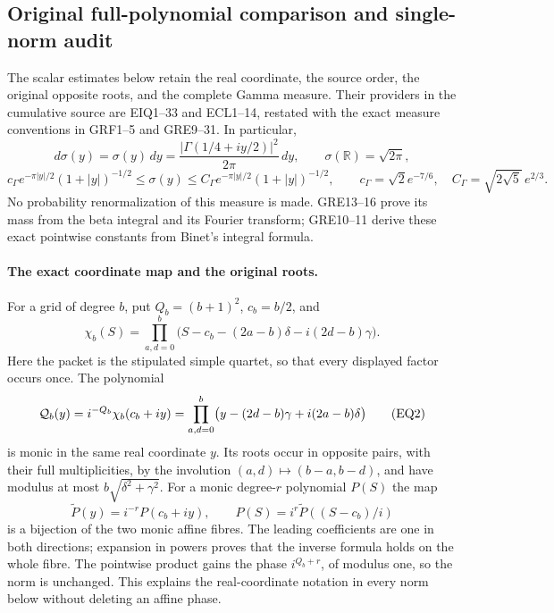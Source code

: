 \documentclass[11pt,a4paper]{article}
\begin{document}

\subsection{Original full-polynomial comparison and single-norm audit}
\label{eqreview:section}

The scalar estimates below retain the real coordinate, the source order,
the original opposite roots, and the complete Gamma measure.  Their
providers in the cumulative source are EIQ1--33 and ECL1--14, restated
with the exact measure conventions in GRF1--5 and GRE9--31.  In particular,
\[
 d\sigma(y)=\sigma(y)\,dy
   =\frac{|\Gamma(1/4+iy/2)|^2}{2\pi}\,dy,\qquad
 \sigma(\mathbb R)=\sqrt{2\pi},
\]
\[
 c_\Gamma e^{-\pi|y|/2}(1+|y|)^{-1/2}
 \le \sigma(y)\le
 C_\Gamma e^{-\pi|y|/2}(1+|y|)^{-1/2},\qquad
 c_\Gamma=\sqrt2 e^{-7/6},\quad
 C_\Gamma=\sqrt{2\sqrt5}\,e^{2/3}.
\tag{EQ1}
\]
No probability renormalization of this measure is made.  GRE13--16
prove its mass from the beta integral and its Fourier transform; GRE10--11
derive these exact pointwise constants from Binet's integral formula.

\paragraph{The exact coordinate map and the original roots.}
For a grid of degree \(b\), put \(Q_b=(b+1)^2\), \(c_b=b/2\), and
\[
 \chi_b(S)=\prod_{a,d=0}^{b}
   \bigl(S-c_b-(2a-b)\delta-i(2d-b)\gamma\bigr).
\]
Here the packet is the stipulated simple quartet, so that every displayed
factor occurs once.  The polynomial
\[
 {\cal Q}_b(y)=i^{-Q_b}\chi_b(c_b+iy)
 =\prod_{a,d=0}^{b}
   \bigl(y-(2d-b)\gamma+i(2a-b)\delta\bigr)
\tag{EQ2}
\]
is monic in the same real coordinate \(y\).  Its roots occur in opposite
pairs, with their full multiplicities, by the involution
\((a,d)\mapsto(b-a,b-d)\), and have modulus at most
\(b\sqrt{\delta^2+\gamma^2}\).  For a monic degree-\(r\) polynomial \(P(S)\)
the map
\[
 \widetilde P(y)=i^{-r}P(c_b+iy),\qquad
 P(S)=i^r\widetilde P((S-c_b)/i)
\tag{EQ3}
\]
is a bijection of the two monic affine fibres.  The leading coefficients
are one in both directions; expansion in powers proves that the inverse
formula holds on the whole fibre.  The pointwise product gains the phase
\(i^{Q_b+r}\), of modulus one, so the norm is unchanged.  This explains
the real-coordinate notation in every norm below without deleting an
affine phase.
\end{document}
